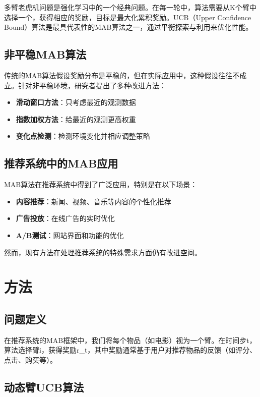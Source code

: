 \documentclass[12pt,a4paper]{article}
\begin{document}
多臂老虎机问题是强化学习中的一个经典问题。在每一轮中，算法需要从K个臂中选择一个，获得相应的奖励，目标是最大化累积奖励。UCB（Upper Confidence Bound）算法是最具代表性的MAB算法之一，通过平衡探索与利用来优化性能。

\subsection{非平稳MAB算法}

传统的MAB算法假设奖励分布是平稳的，但在实际应用中，这种假设往往不成立。针对非平稳环境，研究者提出了多种改进方法：

\begin{itemize}
    \item \textbf{滑动窗口方法}：只考虑最近的观测数据
    \item \textbf{指数加权方法}：给最近的观测更高权重
    \item \textbf{变化点检测}：检测环境变化并相应调整策略
\end{itemize}

\subsection{推荐系统中的MAB应用}

MAB算法在推荐系统中得到了广泛应用，特别是在以下场景：

\begin{itemize}
    \item \textbf{内容推荐}：新闻、视频、音乐等内容的个性化推荐
    \item \textbf{广告投放}：在线广告的实时优化
    \item \textbf{A/B测试}：网站界面和功能的优化
\end{itemize}

然而，现有方法在处理推荐系统的特殊需求方面仍有改进空间。

\section{方法}

\subsection{问题定义}

在推荐系统的MAB框架中，我们将每个物品（如电影）视为一个臂。在时间步t，算法选择臂i，获得奖励r_t，其中奖励通常基于用户对推荐物品的反馈（如评分、点击、购买等）。

\subsection{动态臂UCB算法}
\end{document}
